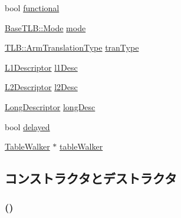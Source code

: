 \begin{DoxyCompactItemize}
\item 
bool \hyperlink{classArmISA_1_1TableWalker_1_1WalkerState_a4f60754b74e2d1584c06199ae5b75f21}{functional}
\item 
\hyperlink{classBaseTLB_a46c8a310cf4c094f8c80e1cb8dc1f911}{BaseTLB::Mode} \hyperlink{classArmISA_1_1TableWalker_1_1WalkerState_ae9b5adf8be89a72128708c7e621e7211}{mode}
\item 
\hyperlink{classArmISA_1_1TLB_ad6f5d480df151d5bddeefc6271793f08}{TLB::ArmTranslationType} \hyperlink{classArmISA_1_1TableWalker_1_1WalkerState_a4dbccde8be57f0db41d7dd786c199318}{tranType}
\item 
\hyperlink{classArmISA_1_1TableWalker_1_1L1Descriptor}{L1Descriptor} \hyperlink{classArmISA_1_1TableWalker_1_1WalkerState_a7ab0bc1bc2c0b56484b750ffd1004d9c}{l1Desc}
\item 
\hyperlink{classArmISA_1_1TableWalker_1_1L2Descriptor}{L2Descriptor} \hyperlink{classArmISA_1_1TableWalker_1_1WalkerState_a4549132cc3bf5f52bc2020e271706c40}{l2Desc}
\item 
\hyperlink{classArmISA_1_1TableWalker_1_1LongDescriptor}{LongDescriptor} \hyperlink{classArmISA_1_1TableWalker_1_1WalkerState_ab6842b95aee60fd76eb273b80bcc566a}{longDesc}
\item 
bool \hyperlink{classArmISA_1_1TableWalker_1_1WalkerState_a08a9405038cd3486ef2ff99cdad274a0}{delayed}
\item 
\hyperlink{classArmISA_1_1TableWalker}{TableWalker} $\ast$ \hyperlink{classArmISA_1_1TableWalker_1_1WalkerState_ae4dec2d4d5730361d51d9f4b24dee89c}{tableWalker}
\end{DoxyCompactItemize}


\subsection{コンストラクタとデストラクタ}
\hypertarget{classArmISA_1_1TableWalker_1_1WalkerState_a380b5d6cc75b764dc369abc26aa867ee}{
\subsubsection[{WalkerState}]{ ()}}
\label{classArmISA_1_1TableWalker_1_1WalkerState_a380b5d6cc75b764dc369abc26aa867ee}



